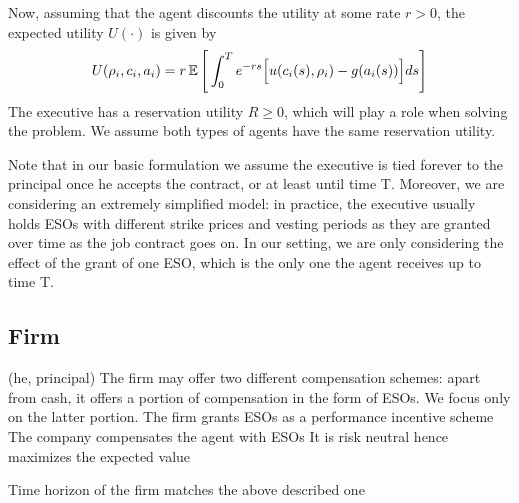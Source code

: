 Now, assuming that the agent discounts the utility at some rate $r>0$, the expected utility $U(\cdot)$ is given by
$$U(\rho_i, c_i, a_i) = r \operatorname{\mathbb{E}} \Bigg[ \int_{0}^{T} e^{-rs} \Big[u(c_i(s), \rho_i) - g(a_i(s)) \Big] ds \Bigg] $$
The executive has a reservation utility $R \ge 0$, which will play a role when solving the problem. We assume both types of agents have the same reservation utility. %


Note that in our basic formulation we assume the executive is tied forever to the principal once he accepts the contract, or at least until time T. Moreover, we are considering an extremely simplified model: in practice, the executive usually holds ESOs with different strike prices and vesting periods as they are granted over time as the job contract goes on. In our setting, we are only considering the effect of the grant of one ESO, which is the only one the agent receives up to time T. 






\subsection{Firm}
(he, principal)
The firm may offer two different compensation schemes: apart from cash, it offers a portion of compensation in the form of ESOs. We focus only on the latter portion. The firm grants ESOs as a performance incentive scheme
The company compensates the agent with ESOs
It is risk neutral hence maximizes the expected value


Time horizon of the firm matches the above described one


